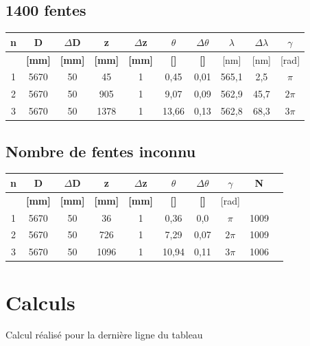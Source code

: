 \documentclass[11pt,a4paper]{report}
\begin{document}
	\subsection{1400 fentes}
	\begin{center}	
	\begin{tabular}{|c|c|c|c|c|c|c|c|c|c|}
		\hline
		\bf n & \bf D & \bf $\Delta$D & \bf z & \bf $\Delta$z & \bf $\theta$ & \bf $\Delta \theta$ & $\lambda$& $\Delta \lambda$&\bf $\gamma$ \\
		\hline
		 & \bf [mm] & \bf [mm] & \bf [mm] & \bf [mm] & \bf [\degre]  & \bf [\degre]  &  [nm] & [nm] & [rad]\\
		\hline
		1 & 5670 & 50 & 45 &   1&0,45&0,01&565,1&2,5&$\pi$\\
		2 & 5670 & 50 & 905 &  1&9,07&0,09&562,9&45,7&$2\pi$\\
		3 & 5670 & 50 & 1378 &  1&13,66&0,13&562,8&68,3&$3\pi$\\
		\hline
	\end{tabular}
	\end{center}
	\subsection{Nombre de fentes inconnu}
	\begin{center}	
	\begin{tabular}{|c|c|c|c|c|c|c|c|c|c|}
		\hline
		\bf n & \bf D & \bf $\Delta$D & \bf z & \bf $\Delta$z & \bf $\theta$ & \bf $\Delta \theta$ &\bf $\gamma$ & N\\
		\hline
		 & \bf [mm] & \bf [mm] & \bf [mm] & \bf [mm] & \bf [\degre]  & \bf [\degre]  & [rad] &\\
		\hline
		1 & 5670 & 50 & 36 &   1&0,36& 0,0 &$\pi$&1009\\
		2 & 5670 & 50 & 726 &  1&7,29& 0,07&$2\pi$&1009\\
		3 & 5670 & 50 & 1096 &  1&10,94&0,11 &$3\pi$&1006\\
		\hline
	\end{tabular}
	\end{center}
	\section{Calculs}
	Calcul réalisé pour la dernière ligne du tableau
\end{document}
